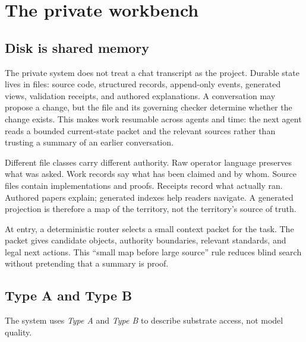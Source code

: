 \documentclass[10pt]{article}
\begin{document}
\section{The private workbench}\label{sec:private}

\subsection{Disk is shared memory}

The private system does not treat a chat transcript as the project. Durable
state lives in files: source code, structured records, append-only events,
generated views, validation receipts, and authored explanations. A conversation
may propose a change, but the file and its governing checker determine whether
the change exists. This makes work resumable across agents and time: the next
agent reads a bounded current-state packet and the relevant sources rather than
trusting a summary of an earlier conversation.

Different file classes carry different authority. Raw operator language
preserves what was asked. Work records say what has been claimed and by whom.
Source files contain implementations and proofs. Receipts record what actually
ran. Authored papers explain; generated indexes help readers navigate. A
generated projection is therefore a map of the territory, not the territory's
source of truth.

At entry, a deterministic router selects a small context packet for the task.
The packet gives candidate objects, authority boundaries, relevant standards,
and legal next actions. This ``small map before large source'' rule reduces
blind search without pretending that a summary is proof.

\subsection{Type A and Type B}

The system uses \emph{Type A} and \emph{Type B} to describe substrate access,
not model quality.
\end{document}
